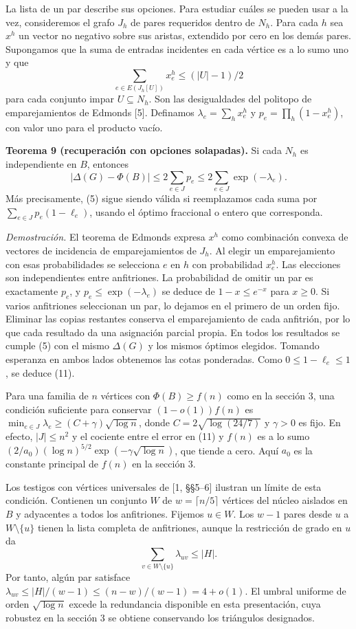 \documentclass[spanish,11pt,a4paper]{article}
\begin{document}
La lista de un par describe sus opciones. Para estudiar cuáles se pueden usar a la vez, consideremos el grafo \(J_h\) de pares requeridos dentro de \(N_h\). Para cada \(h\) sea \(x^h\) un vector no negativo sobre sus aristas, extendido por cero en los demás pares. Supongamos que la suma de entradas incidentes en cada vértice es a lo sumo uno y que \[
\sum_{e\in E(J_h[U])}x^h_e\le (|U|-1)/2
\] para cada conjunto impar \(U\subseteq N_h\). Son las desigualdades del politopo de emparejamientos de Edmonds {[}5{]}. Definamos \(\lambda_e=\sum_h x^h_e\) y \(p_e=\prod_h(1-x^h_e)\), con valor uno para el producto vacío.

\textbf{Teorema 9 (recuperación con opciones solapadas).} Si cada \(N_h\) es independiente en \(B\), entonces \[
|\Delta(G)-\Phi(B)|\le 2\sum_{e\in J}p_e
                  \le 2\sum_{e\in J}\exp(-\lambda_e). \tag{11}
\] Más precisamente, (5) sigue siendo válida si reemplazamos cada suma por \(\sum_{e\in J}p_e(1-\ell_e)\), usando el óptimo fraccional o entero que corresponda.

\emph{Demostración.} El teorema de Edmonds expresa \(x^h\) como combinación convexa de vectores de incidencia de emparejamientos de \(J_h\). Al elegir un emparejamiento con esas probabilidades se selecciona \(e\) en \(h\) con probabilidad \(x^h_e\). Las elecciones son independientes entre anfitriones. La probabilidad de omitir un par es exactamente \(p_e\), y \(p_e\le\exp(-\lambda_e)\) se deduce de \(1-x\le e^{-x}\) para \(x\ge0\). Si varios anfitriones seleccionan un par, lo dejamos en el primero de un orden fijo. Eliminar las copias restantes conserva el emparejamiento de cada anfitrión, por lo que cada resultado da una asignación parcial propia. En todos los resultados se cumple (5) con el mismo \(\Delta(G)\) y los mismos óptimos elegidos. Tomando esperanza en ambos lados obtenemos las cotas ponderadas. Como \(0\le1-\ell_e\le1\), se deduce (11).

Para una familia de \(n\) vértices con \(\Phi(B)\ge f(n)\) como en la sección 3, una condición suficiente para conservar \((1-o(1))f(n)\) es \(\min_{e\in J}\lambda_e\ge(C+\gamma)\sqrt{\log n}\), donde \(C=2\sqrt{\log(24/7)}\) y \(\gamma>0\) es fijo. En efecto, \(|J|\le n^2\) y el cociente entre el error en (11) y \(f(n)\) es a lo sumo \((2/a_0)(\log n)^{5/2}\exp(-\gamma\sqrt{\log n})\), que tiende a cero. Aquí \(a_0\) es la constante principal de \(f(n)\) en la sección 3.

Los testigos con vértices universales de {[}1, §§5--6{]} ilustran un límite de esta condición. Contienen un conjunto \(W\) de \(w=\lceil n/5\rceil\) vértices del núcleo aislados en \(B\) y adyacentes a todos los anfitriones. Fijemos \(u\in W\). Los \(w-1\) pares desde \(u\) a \(W\setminus\{u\}\) tienen la lista completa de anfitriones, aunque la restricción de grado en \(u\) da \[
\sum_{v\in W\setminus\{u\}}\lambda_{uv}\le |H|.
\] Por tanto, algún par satisface \(\lambda_{uv}\le |H|/(w-1)\le(n-w)/(w-1)=4+o(1)\). El umbral uniforme de orden \(\sqrt{\log n}\) excede la redundancia disponible en esta presentación, cuya robustez en la sección 3 se obtiene conservando los triángulos designados.
\end{document}
